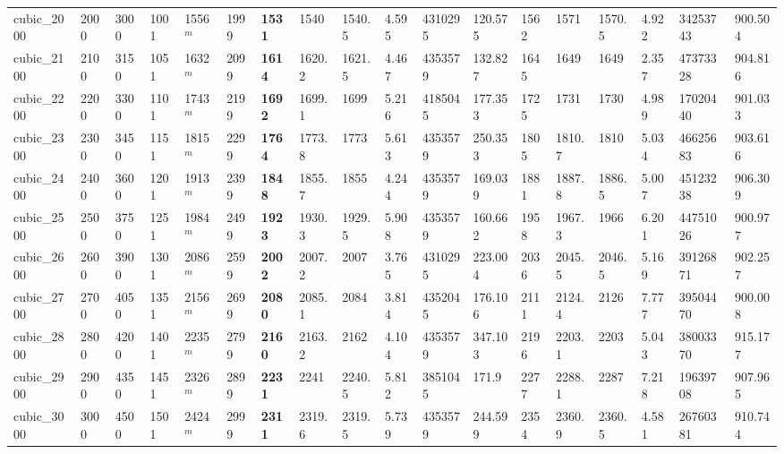 \begin{table}[h!]
{\begin{tabular}{llllllllllllllllll}
            cubic\_2000 & 2000 & 3000 & 1001 & 1556$^{m}$ & 1999 & \textbf{1531} & 1540 & 1540.5 & 4.595 & 4310295 & 120.575 & 1562 & 1571 & 1570.5 & 4.922 & 34253743 & 900.504 \\
            cubic\_2100 & 2100 & 3150 & 1051 & 1632$^{m}$ & 2099 & \textbf{1614} & 1620.2 & 1621.5 & 4.467 & 4353579 & 132.827 & 1645 & 1649 & 1649 & 2.357 & 47373328 & 904.816 \\
            cubic\_2200 & 2200 & 3300 & 1101 & 1743$^{m}$ & 2199 & \textbf{1692} & 1699.1 & 1699 & 5.216 & 4185045 & 177.353 & 1725 & 1731 & 1730 & 4.989 & 17020440 & 901.033 \\
            cubic\_2300 & 2300 & 3450 & 1151 & 1815$^{m}$ & 2299 & \textbf{1764} & 1773.8 & 1773 & 5.613 & 4353579 & 250.353 & 1805 & 1810.7 & 1810 & 5.034 & 46625683 & 903.616 \\
            cubic\_2400 & 2400 & 3600 & 1201 & 1913$^{m}$ & 2399 & \textbf{1848} & 1855.7 & 1855 & 4.244 & 4353579 & 169.039 & 1881 & 1887.8 & 1886.5 & 5.007 & 45123238 & 906.309 \\
            cubic\_2500 & 2500 & 3750 & 1251 & 1984$^{m}$ & 2499 & \textbf{1923} & 1930.3 & 1929.5 & 5.908 & 4353579 & 160.662 & 1958 & 1967.3 & 1966 & 6.201 & 44751026 & 900.977 \\
            cubic\_2600 & 2600 & 3900 & 1301 & 2086$^{m}$ & 2599 & \textbf{2002} & 2007.2 & 2007 & 3.765 & 4310295 & 223.004 & 2036 & 2045.5 & 2046.5 & 5.169 & 39126871 & 902.257 \\
            cubic\_2700 & 2700 & 4050 & 1351 & 2156$^{m}$ & 2699 & \textbf{2080} & 2085.1 & 2084 & 3.814 & 4352045 & 176.106 & 2111 & 2124.4 & 2126 & 7.777 & 39504470 & 900.008 \\
            cubic\_2800 & 2800 & 4200 & 1401 & 2235$^{m}$ & 2799 & \textbf{2160} & 2163.2 & 2162 & 4.104 & 4353579 & 347.103 & 2196 & 2203.1 & 2203 & 5.043 & 38003370 & 915.177 \\
            cubic\_2900 & 2900 & 4350 & 1451 & 2326$^{m}$ & 2899 & \textbf{2231} & 2241 & 2240.5 & 5.812 & 3851045 & 171.9 & 2277 & 2288.1 & 2287 & 7.218 & 19639708 & 907.965 \\
            cubic\_3000 & 3000 & 4500 & 1501 & 2424$^{m}$ & 2999 & \textbf{2311} & 2319.6 & 2319.5 & 5.739 & 4353579 & 244.599 & 2354 & 2360.9 & 2360.5 & 4.581 & 26760381 & 910.744 \\
            \bottomrule
        \end{tabular}
    }{
}
\end{table}

